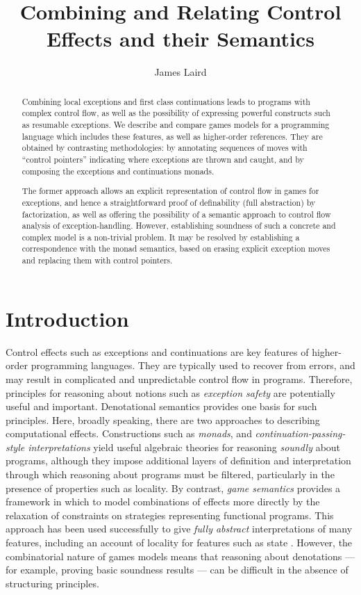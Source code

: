 \documentclass{eptcs}
\begin{document}
\title{Combining and Relating Control Effects and their Semantics }
\author{James Laird
}
\date{}
\maketitle
\begin{abstract}Combining local exceptions and first class continuations leads to programs with complex control flow, as well as the possibility of expressing powerful constructs such as resumable  exceptions.  We describe and compare games models for a  programming language which includes these features, as well as higher-order references. 
They are obtained by contrasting methodologies: by annotating sequences of moves with ``control pointers'' indicating where exceptions are thrown and caught, and by composing the  exceptions and continuations monads.
  

 The former approach allows an explicit representation of control flow in games for exceptions, and hence a straightforward proof of definability (full abstraction) by factorization, as well as offering the possibility of a semantic approach to control flow analysis of exception-handling. However, establishing soundness of such a concrete and complex model is a non-trivial problem. It may be resolved by establishing  a correspondence  with the monad semantics, based on erasing explicit exception moves and replacing them with control pointers.  
\end{abstract}


\section{Introduction}
Control effects such as exceptions and continuations are  key features of higher-order programming languages. They are typically used to recover from errors, and may result in complicated and unpredictable control flow in programs. Therefore, principles for reasoning about notions such as \emph{exception safety} are potentially useful and important. Denotational semantics provides one basis for such principles. Here, broadly speaking, there are two  approaches to describing computational effects.  Constructions such as \emph{monads}, and \emph{continuation-passing-style interpretations} yield  useful algebraic theories for reasoning \emph{soundly} about programs, although they impose additional layers of definition and interpretation through which reasoning about programs must be filtered, particularly in the presence of  properties such as locality. By contrast, \emph{game semantics} provides a framework in which to model combinations of effects more directly by the relaxation of constraints on strategies representing functional programs. This approach has  been used successfully to give \emph{fully abstract} interpretations of many features, including an   account of locality for  features such as state \cite{AHM}. However, the  combinatorial nature of games models means that reasoning about denotations  --- for example, proving basic soundness results --- can be  difficult in the absence of structuring principles.
\end{document}

